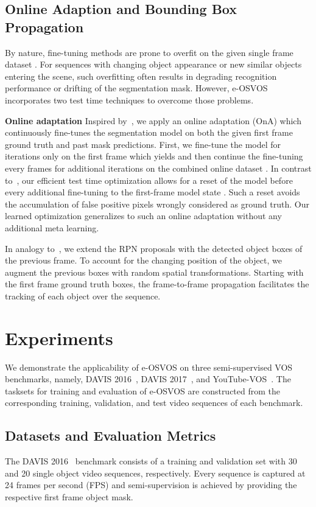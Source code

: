 \documentclass{article}
\begin{document}
\subsection{Online Adaption and Bounding Box Propagation} \label{sec:online_adaptation}
    By nature, fine-tuning methods are prone to overfit on the given single frame dataset .
For sequences with changing object appearance or new similar objects entering the scene, such overfitting often results in degrading recognition performance or drifting of the segmentation mask.
However, e-OSVOS incorporates two test time techniques to overcome those problems.

  {\bf Online adaptation}
Inspired by~\cite{onavos}, we apply an online adaptation (OnA) which continuously fine-tunes the segmentation model on both the given first frame ground truth and past mask predictions.
First, we fine-tune the model for  iterations only on the first frame which yields  and then continue the fine-tuning every  frames for  additional iterations on the combined online dataset .
In contrast to~\cite{onavos}, our efficient test time optimization allows for a reset of the model before every additional fine-tuning to the first-frame model state .
Such a reset avoids the accumulation of false positive pixels wrongly considered as ground truth.
Our learned optimization  generalizes to such an online adaptation without any additional meta learning.


In analogy to~\cite{tracktor_2019_ICCV}, we extend the RPN proposals with the detected object boxes of the previous frame.
To account for the changing position of the object, we augment the previous boxes with random spatial transformations.
Starting with the first frame ground truth boxes, the frame-to-frame propagation facilitates the tracking of each object over the sequence.
 \section{Experiments}

    We demonstrate the applicability of e-OSVOS on three semi-supervised VOS benchmarks, namely, DAVIS 2016~\cite{DAVIS16}, DAVIS 2017~\cite{DAVIS17semi}, and YouTube-VOS~\cite{Xu2018YouTubeVOSAL}.
The tasksets  for training and evaluation of e-OSVOS are constructed from the corresponding training, validation, and test video sequences of each benchmark.

\subsection{Datasets and Evaluation Metrics}
        The DAVIS 2016~\cite{DAVIS16} benchmark consists of a training and validation set with 30 and 20 single object video sequences, respectively.
Every sequence is captured at 24 frames per second (FPS) and semi-supervision is achieved by providing the respective first frame object mask.
\end{document}
